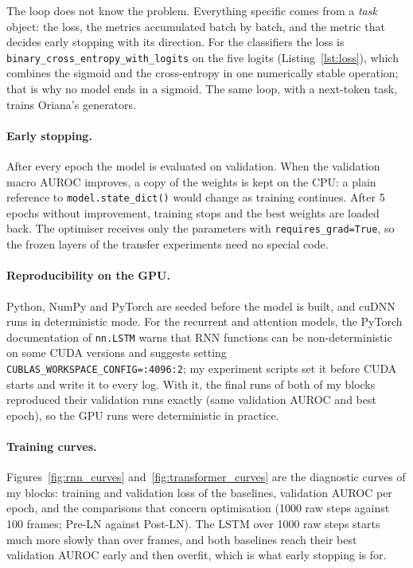 The loop does not know the problem. Everything specific comes from a \emph{task} object: the loss, the
metrics accumulated batch by batch, and the metric that decides early stopping with its direction. For the
classifiers the loss is \texttt{binary\_cross\_entropy\_with\_logits} on the five logits
(Listing~\ref{lst:loss}), which combines the sigmoid and the cross-entropy in one numerically stable
operation; that is why no model ends in a sigmoid. The same loop, with a next-token task, trains Oriana's
generators.



\paragraph{Early stopping.} After every epoch the model is evaluated on validation. When the validation
macro AUROC improves, a copy of the weights is kept on the CPU: a plain reference to
\texttt{model.state\_dict()} would change as training continues. After 5 epochs without improvement,
training stops and the best weights are loaded back. The optimiser receives only the parameters with
\texttt{requires\_grad=True}, so the frozen layers of the transfer experiments need no special code.

\paragraph{Reproducibility on the GPU.} Python, NumPy and PyTorch are seeded before the model is built, and
cuDNN runs in deterministic mode. For the recurrent and attention models, the PyTorch documentation of
\texttt{nn.LSTM} warns that RNN functions can be non-deterministic on some CUDA versions and suggests
setting \texttt{CUBLAS\_WORKSPACE\_CONFIG=:4096:2}; my experiment scripts set it before CUDA starts and
write it to every log. With it, the final runs of both of my blocks reproduced their validation runs
exactly (same validation AUROC and best epoch), so the GPU runs were deterministic in practice.

\paragraph{Training curves.} Figures~\ref{fig:rnn_curves} and~\ref{fig:transformer_curves} are the
diagnostic curves of my blocks: training and validation loss of the baselines, validation AUROC per epoch,
and the comparisons that concern optimisation (1000 raw steps against 100 frames; Pre-LN against Post-LN).
The LSTM over 1000 raw steps starts much more slowly than over frames, and both baselines reach their best
validation AUROC early and then overfit, which is what early stopping is for.

